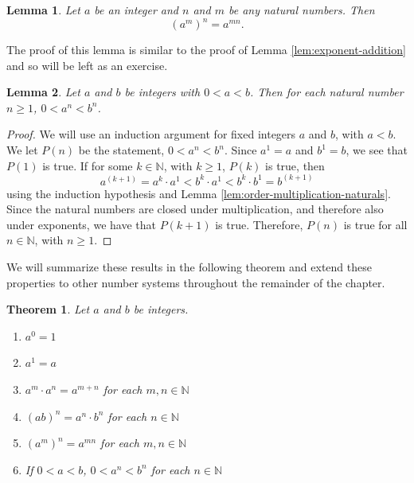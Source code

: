 \documentclass[
]{book}
\newtheorem{theorem}{Theorem}[chapter]
\newtheorem{lemma}{Lemma}[chapter]
\theoremstyle{definition}
\theoremstyle{definition}
\theoremstyle{definition}
\theoremstyle{remark}
\begin{document}
\begin{lemma}
\protect\hypertarget{lem:exponent-product}{}{\label{lem:exponent-product} }Let \(a\) be an integer and \(n\) and \(m\) be any natural numbers. Then \[(a^m)^n = a^{mn}.\]
\end{lemma}

The proof of this lemma is similar to the proof of Lemma \ref{lem:exponent-addition} and so will be left as an exercise.

\begin{lemma}
\protect\hypertarget{lem:unnamed-chunk-57}{}{\label{lem:unnamed-chunk-57} }Let \(a\) and \(b\) be integers with \(0<a<b\). Then for each natural number \(n\geq 1\), \(0<a^n<b^n\).
\end{lemma}

\begin{proof}
{}We will use an induction argument for fixed integers \(a\) and \(b\), with \(a<b\). We let \(P(n)\) be the statement, \(0<a^n<b^n\). Since \(a^1=a\) and \(b^1=b\), we see that \(P(1)\) is true. If for some \(k\in \mathbb{N}\), with \(k\geq 1\), \(P(k)\) is true, then
\[ a^{(k+1)}=a^k\cdot a^1 < b^k \cdot a^1 < b^k \cdot b^1 = b^{(k+1)}\] using the induction hypothesis and Lemma \ref{lem:order-multiplication-naturals}. Since the natural numbers are closed under multiplication, and therefore also under exponents, we have that \(P(k+1)\) is true. Therefore, \(P(n)\) is true for all \(n\in \mathbb{N}\), with \(n\geq 1\).
\end{proof}

We will summarize these results in the following theorem and extend these properties to other number systems throughout the remainder of the chapter.

\begin{theorem}
\protect\hypertarget{thm:exponents-integers}{}{\label{thm:exponents-integers} }Let \(a\) and \(b\) be integers.

\begin{enumerate}
\def\labelenumi{\alph{enumi}.}
\item
  \(a^0=1\)
\item
  \(a^1=a\)
\item
  \(a^m\cdot a^n = a^{m+n}\) for each \(m,n\in \mathbb{N}\)
\item
  \((ab)^n=a^n\cdot b^n\) for each \(n\in \mathbb{N}\)
\item
  \((a^m)^n = a^{mn}\) for each \(m,n\in \mathbb{N}\)
\item
  If \(0<a<b\), \(0<a^n<b^n\) for each \(n\in \mathbb{N}\)
\end{enumerate}
\end{theorem}
\end{document}
